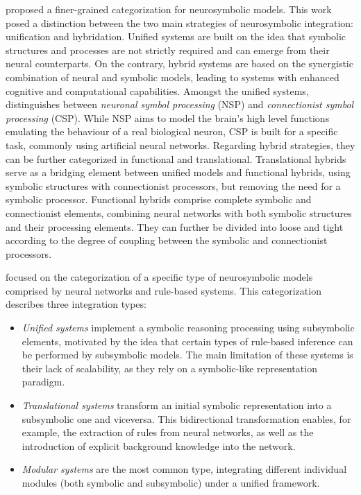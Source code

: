 \cite{hilario_overview_nodate} proposed a finer-grained categorization for neurosymbolic models. This work posed a distinction between the two main strategies of neurosymbolic integration: unification and hybridation. Unified systems are built on the idea that symbolic structures and processes are not strictly required and can emerge from their neural counterparts. On the contrary, hybrid systems are based on the synergistic combination of neural and symbolic models, leading to systems with enhanced cognitive and computational capabilities. Amongst the unified systems, \cite{hilario_overview_nodate} distinguishes between \textit{neuronal symbol processing} (NSP) and \textit{connectionist symbol processing} (CSP). While NSP aims to model the brain's high level functions emulating the behaviour of a real biological neuron, CSP is built for a specific task, commonly using artificial neural networks. Regarding hybrid strategies, they can be further categorized in functional and translational. Translational hybrids serve as a bridging element between unified models and functional hybrids, using symbolic structures with connectionist processors, but removing the need for a symbolic processor. Functional hybrids comprise complete symbolic and connectionist elements, combining neural networks with both symbolic structures and their processing elements. They can further be divided into loose and tight according to the degree of coupling between the symbolic and connectionist processors. 


\cite{mcgarry_hybrid_1999} focused on the categorization of a specific type of neurosymbolic models comprised by neural networks and rule-based systems. This categorization describes three integration types: \begin{itemize}
    \item \textit{Unified systems} implement a symbolic reasoning processing using subsymbolic elements, motivated by the idea that certain types of rule-based inference can be performed by subsymbolic models. The main limitation of these systems is their lack of scalability, as they rely on a symbolic-like representation paradigm.
    \item \textit{Translational systems} transform an initial symbolic representation into a subsymbolic one and viceversa. This bidirectional transformation enables, for example, the extraction of rules from neural networks, as well as the introduction of explicit background knowledge into the network. 
    \item \textit{Modular systems} are the most common type, integrating different individual modules (both symbolic and subsymbolic) under a unified framework.
\end{itemize} 

